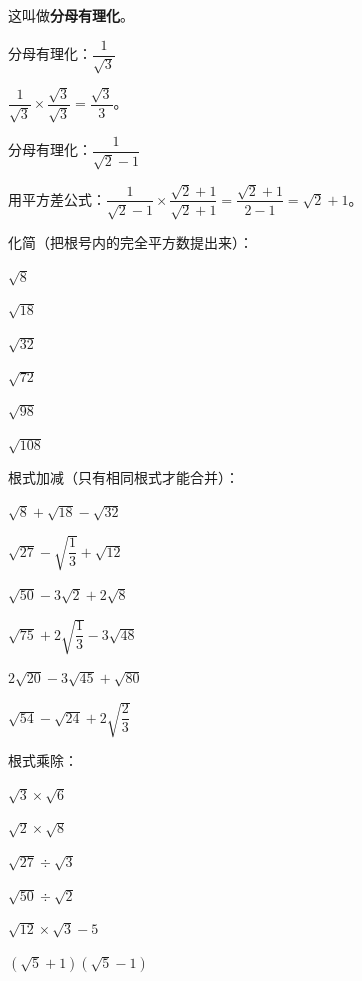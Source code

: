 这叫做\textbf{分母有理化}。

\begin{example}
分母有理化：$\dfrac{1}{\sqrt{3}}$
\end{example}
\begin{solution}
$\dfrac{1}{\sqrt{3}} \times \dfrac{\sqrt{3}}{\sqrt{3}} = \dfrac{\sqrt{3}}{3}$。
\end{solution}

\begin{example}
分母有理化：$\dfrac{1}{\sqrt{2}-1}$
\end{example}
\begin{solution}
用平方差公式：$\dfrac{1}{\sqrt{2}-1}\times\dfrac{\sqrt{2}+1}{\sqrt{2}+1} = \dfrac{\sqrt{2}+1}{2-1} = \sqrt{2}+1$。
\end{solution}

\begin{exercise}
\item 化简（把根号内的完全平方数提出来）：
  \begin{subexercise}
    \item $\sqrt{8}$
    \item $\sqrt{18}$
    \item $\sqrt{32}$
    \item $\sqrt{72}$
    \item $\sqrt{98}$
    \item $\sqrt{108}$
  \end{subexercise}

\item 根式加减（只有相同根式才能合并）：
  \begin{subexercise}
    \item $\sqrt{8}+\sqrt{18}-\sqrt{32}$
    \item $\sqrt{27}-\sqrt{\dfrac{1}{3}}+\sqrt{12}$
    \item $\sqrt{50}-3\sqrt{2}+2\sqrt{8}$
    \item $\sqrt{75}+2\sqrt{\dfrac{1}{3}}-3\sqrt{48}$
    \item $2\sqrt{20}-3\sqrt{45}+\sqrt{80}$
    \item $\sqrt{54}-\sqrt{24}+2\sqrt{\dfrac{2}{3}}$
  \end{subexercise}

\item 根式乘除：
  \begin{subexercise}
    \item $\sqrt{3}\times\sqrt{6}$
    \item $\sqrt{2}\times\sqrt{8}$
    \item $\sqrt{27}\div\sqrt{3}$
    \item $\sqrt{50}\div\sqrt{2}$
    \item $\sqrt{12}\times\sqrt{3}-5$
    \item $(\sqrt{5}+1)(\sqrt{5}-1)$
  \end{subexercise}


\end{exercise}
